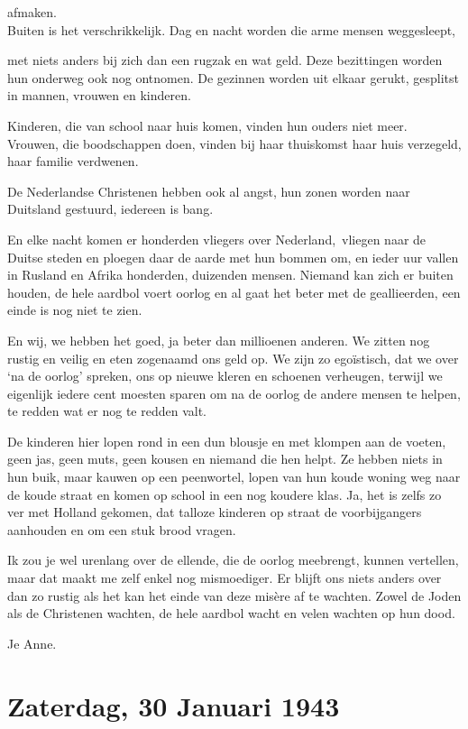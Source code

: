 \documentclass{book}
\begin{document}
afmaken.\\Buiten is het verschrikkelijk. Dag en nacht worden die arme
mensen weggesleept,

met niets anders bij zich dan een rugzak en wat geld. Deze bezittingen
worden hun onderweg ook nog ontnomen. De gezinnen worden uit elkaar
gerukt, gesplitst in mannen, vrouwen en kinderen.

Kinderen, die van school naar huis komen, vinden hun ouders niet meer.
Vrouwen, die boodschappen doen, vinden bij haar thuiskomst haar huis
verzegeld, haar familie verdwenen.

De Nederlandse Christenen hebben ook al angst, hun zonen worden naar
Duitsland gestuurd, iedereen is bang.

En elke nacht komen er honderden vliegers over Nederland,~vliegen naar
de Duitse steden en ploegen daar de aarde met hun bommen om, en ieder
uur vallen in Rusland en Afrika honderden, duizenden mensen. Niemand kan
zich er buiten houden, de hele aardbol voert oorlog en al gaat het beter
met de geallieerden, een einde is nog niet te zien.

En wij, we hebben het goed, ja beter dan millioenen anderen. We zitten
nog rustig en veilig en eten zogenaamd ons geld op. We zijn zo
egoïstisch, dat we over `na de oorlog' spreken, ons op nieuwe kleren en
schoenen verheugen, terwijl we eigenlijk iedere cent moesten sparen om
na de oorlog de andere mensen te helpen, te redden wat er nog te redden
valt.

De kinderen hier lopen rond in een dun blousje en met klompen aan de
voeten, geen jas, geen muts, geen kousen en niemand die hen helpt. Ze
hebben niets in hun buik, maar kauwen op een peenwortel, lopen van hun
koude woning weg naar de koude straat en komen op school in een nog
koudere klas. Ja, het is zelfs zo ver met Holland gekomen, dat talloze
kinderen op straat de voorbijgangers aanhouden en om een stuk brood
vragen.

Ik zou je wel urenlang over de ellende, die de oorlog meebrengt, kunnen
vertellen, maar dat maakt me zelf enkel nog mismoediger. Er blijft ons
niets anders over dan zo rustig als het kan het einde van deze misère af
te wachten. Zowel de Joden als de Christenen wachten, de hele aardbol
wacht en velen wachten op hun dood.

Je Anne.

\chapter{Zaterdag, 30 Januari 1943}
\end{document}
